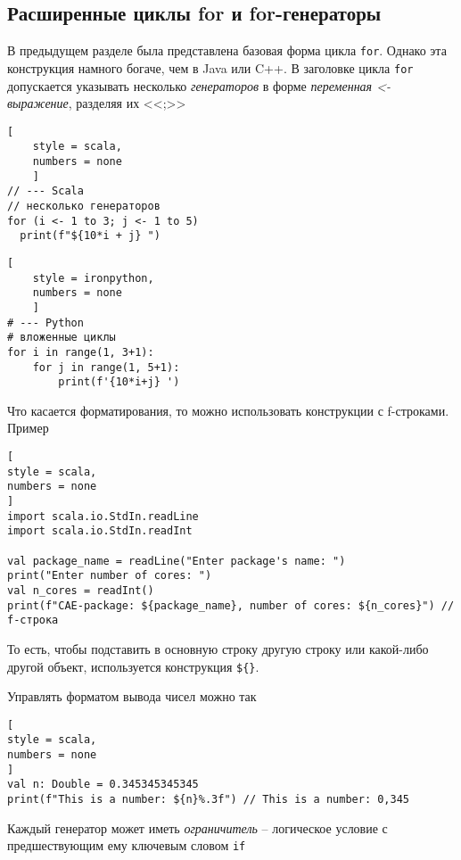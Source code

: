 \documentclass[%
	11pt,
	a4paper,
	utf8,
		]{article}
\begin{document}
\subsection{Расширенные циклы for и for-генераторы}

В предыдущем разделе была представлена базовая форма цикла \texttt{for}. Однако эта конструкция намного богаче, чем в Java или C++. В заголовке цикла \texttt{for} допускается указывать несколько \emph{генераторов} в форме \textit{переменная <- выражение}, разделяя их <<;>>

\begin{minipage}[t]{0.45\textwidth}
	\begin{lstlisting}[
	style = scala,
	numbers = none	
	]
// --- Scala
// несколько генераторов
for (i <- 1 to 3; j <- 1 to 5)
  print(f"${10*i + j} ")
	\end{lstlisting}
\end{minipage}
\hspace*{2mm}
\begin{minipage}[t]{0.45\textwidth}
	\begin{lstlisting}[
	style = ironpython,
	numbers = none	
	]
# --- Python
# вложенные циклы
for i in range(1, 3+1):
    for j in range(1, 5+1):
        print(f'{10*i+j} ')
	\end{lstlisting}
\end{minipage}

Что касается форматирования, то можно использовать конструкции с f-строками. Пример
\begin{lstlisting}[
style = scala,
numbers = none
]
import scala.io.StdIn.readLine
import scala.io.StdIn.readInt

val package_name = readLine("Enter package's name: ")
print("Enter number of cores: ")
val n_cores = readInt()
print(f"CAE-package: ${package_name}, number of cores: ${n_cores}") // f-строка
\end{lstlisting}

То есть, чтобы подставить в основную строку другую строку или какой-либо другой объект, используется конструкция \verb|${}|.

Управлять форматом вывода чисел можно так
\begin{lstlisting}[
style = scala,
numbers = none
]
val n: Double = 0.345345345345
print(f"This is a number: ${n}%.3f") // This is a number: 0,345
\end{lstlisting}

Каждый генератор может иметь \emph{ограничитель} -- логическое условие с предшествующим ему ключевым словом \texttt{if}
\end{document}
